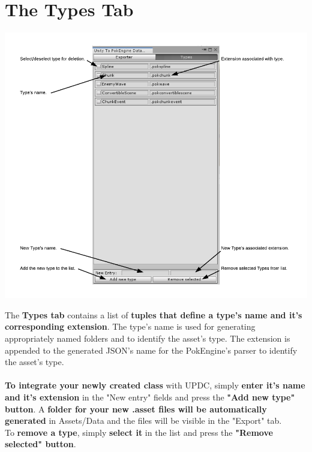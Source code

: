 \documentclass[10pt,a4paper]{article}
\begin{document}
\section{The Types Tab}
\begin{center}
\includegraphics[scale=0.55]{typesUi}
\end{center}
The \textbf{Types tab} contains a list of \textbf{tuples that define a type's name and it's corresponding extension}.
The type's name is used for generating appropriately named folders and to identify the asset's type. The extension is appended to the generated JSON's name for the PokEngine's parser to identify the asset's type.\\\\
\textbf{To integrate your newly created class} with UPDC, simply \textbf{enter it's name and it's extension} in the "New entry" fields and press the \textbf{"Add new type" button}.
A \textbf{folder for your new .asset files will be automatically generated} in Assets/Data and the files will be visible in the "Export" tab.\\
To \textbf{remove a type}, simply \textbf{select it} in the list and press the \textbf{"Remove selected" button}.
\newpage
\end{document}
